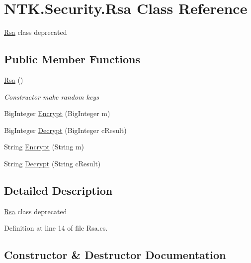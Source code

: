 \hypertarget{class_n_t_k_1_1_security_1_1_rsa}{}\section{N\+T\+K.\+Security.\+Rsa Class Reference}
\label{class_n_t_k_1_1_security_1_1_rsa}


\mbox{\hyperlink{class_n_t_k_1_1_security_1_1_rsa}{Rsa}} class deprecated  


\subsection*{Public Member Functions}
\begin{DoxyCompactItemize}
\item 
\mbox{\hyperlink{class_n_t_k_1_1_security_1_1_rsa_a7a5efae73f662dc143e2c57a6bfd4449}{Rsa}} ()
\begin{DoxyCompactList}\small\item\em Constructor make random keys \end{DoxyCompactList}\item 
Big\+Integer \mbox{\hyperlink{class_n_t_k_1_1_security_1_1_rsa_a2ad95f6c6ea4cdef88949c94145d9d57}{Encrypt}} (Big\+Integer m)
\item 
Big\+Integer \mbox{\hyperlink{class_n_t_k_1_1_security_1_1_rsa_aeb04928fc2be84718eaf7a68f3216d12}{Decrypt}} (Big\+Integer c\+Result)
\item 
String \mbox{\hyperlink{class_n_t_k_1_1_security_1_1_rsa_a3081cd0d7805a401fb9f4fdff0572114}{Encrypt}} (String m)
\item 
String \mbox{\hyperlink{class_n_t_k_1_1_security_1_1_rsa_a3de3f74fc427ba58000c798fa7448d09}{Decrypt}} (String c\+Result)
\end{DoxyCompactItemize}


\subsection{Detailed Description}
\mbox{\hyperlink{class_n_t_k_1_1_security_1_1_rsa}{Rsa}} class deprecated 



Definition at line 14 of file Rsa.\+cs.



\subsection{Constructor \& Destructor Documentation}
\mbox{\label{class_n_t_k_1_1_security_1_1_rsa_a7a5efae73f662dc143e2c57a6bfd4449}} 
